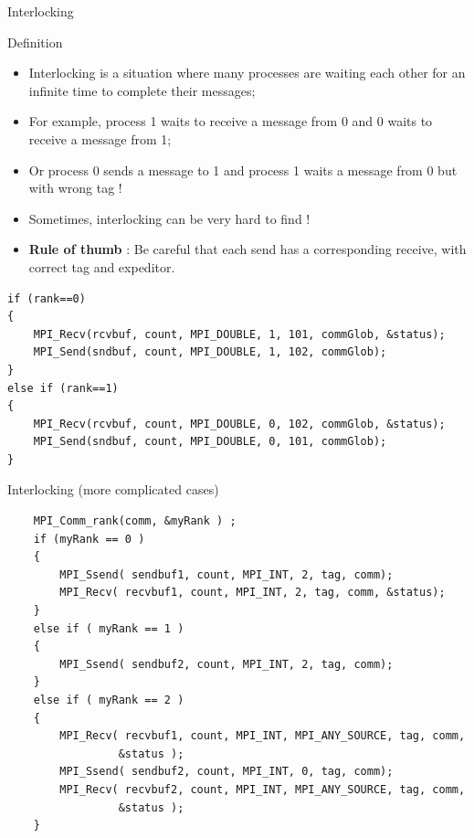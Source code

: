 \documentclass[compress,10pt,aspectratio=169]{beamer}
\begin{document}
\begin{frame}[fragile]{Interlocking}
    \scriptsize
    \begin{block}{Definition}
        \begin{itemize}
            \item Interlocking is a situation where many processes are waiting each other for an infinite time to complete their messages;
            \item For example, process 1 waits to receive a message from 0 and 0 waits to receive a message from 1;
            \item Or process 0 sends a message to 1 and process 1 waits a message from 0 but with wrong tag !
            \item Sometimes, interlocking can be very hard to find !
            \item \textbf{Rule of thumb} : Be careful that each send has a corresponding receive, with correct tag and expeditor.
        \end{itemize}
    \end{block}

\begin{verbatim}
if (rank==0)
{
    MPI_Recv(rcvbuf, count, MPI_DOUBLE, 1, 101, commGlob, &status);
    MPI_Send(sndbuf, count, MPI_DOUBLE, 1, 102, commGlob);
}
else if (rank==1)
{
    MPI_Recv(rcvbuf, count, MPI_DOUBLE, 0, 102, commGlob, &status);
    MPI_Send(sndbuf, count, MPI_DOUBLE, 0, 101, commGlob);
}
\end{verbatim}
\end{frame}

\begin{frame}[fragile]{Interlocking (more complicated cases)}

    \begin{verbatim}
    MPI_Comm_rank(comm, &myRank ) ;
    if (myRank == 0 ) 
    {
        MPI_Ssend( sendbuf1, count, MPI_INT, 2, tag, comm);
        MPI_Recv( recvbuf1, count, MPI_INT, 2, tag, comm, &status);
    } 
    else if ( myRank == 1 ) 
    {
        MPI_Ssend( sendbuf2, count, MPI_INT, 2, tag, comm);
    }
    else if ( myRank == 2 ) 
    {
        MPI_Recv( recvbuf1, count, MPI_INT, MPI_ANY_SOURCE, tag, comm,
                 &status );
        MPI_Ssend( sendbuf2, count, MPI_INT, 0, tag, comm);
        MPI_Recv( recvbuf2, count, MPI_INT, MPI_ANY_SOURCE, tag, comm,
                 &status );
    }    
    \end{verbatim}
    \end{frame}
    
\end{document}
